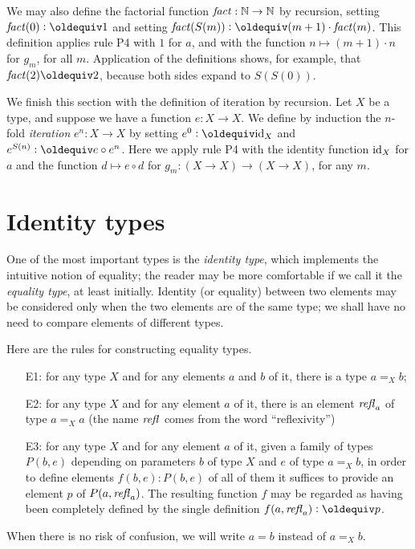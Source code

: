 We may also define the factorial function $\mathop{\mathit{fact}} : \mathbb{N} \to \mathbb{N}$ by recursion, setting $\fact(0) \defeq 1$ and setting
$\fact(S(m)) \defeq (m+1) \cdot \fact(m)$.  This definition applies rule P4 with $1$ for $a$, and with the
function $n \mapsto (m+1) \cdot n$ for $g_m$, for all $m$.
Application of the definitions shows, for example, that $\fact(2) \jdeq 2$, because both sides expand to $S(S(0))$.

We finish this section with the definition of iteration by recursion.  Let $X$ be a type, and suppose we have a function $e : X \to X$.  We
define by induction the $n$-fold \emph{iteration} $e^n : X \to X$ by setting $e^0 \defeq \id_X$ and $e^{S(n)}\defeq e\circ e^n$.
Here we apply rule P4 with the identity function $\mathord{\mathrm{id}}_X$ for $a$
and the function $d \mapsto e\circ d$ for $g_m : (X\to X)\to(X\to X)$, for any $m$.

\section{Identity types}
\label{sec:identity-types}

One of the most important types is the \emph{identity type}, which implements the intuitive notion of equality; the reader may be more
comfortable if we call it the \emph{equality type}, at least initially.  Identity (or equality) between two elements may be considered only when
the two elements are of the same type; we shall have no need to compare elements of different types.

Here are the rules for constructing equality types.
\begin{enumerate}
\item[E1:]
  for any type $X$ and for any elements $a$ and $b$ of it, there is a type $a =_X b$;
\item[E2:] for any type $X$ and for any element $a$ of it, there is an element $\mathop{{\it refl}_{a}}$ of type $a =_X a$ (the name $\mathop{{\it refl}_{}}$ comes from the word
  ``reflexivity'')
\item[E3:] for any type $X$ and for any element $a$ of it, given a family of types $P(b,e)$ depending on parameters $b$ of type $X$ and $e$ of type
  $a =_X b$, in order to define elements $f(b,e) : P(b,e)$ of all of them it suffices to provide an element $p$ of $P(a,\mathop{{\it refl}_{a}})$.  The resulting
  function $f$ may be regarded as having been completely defined by the single definition $f(a,\refl a) \defeq p$.
\end{enumerate}

When there is no risk of confusion, we will write $a=b$ instead of $a =_X b$.

